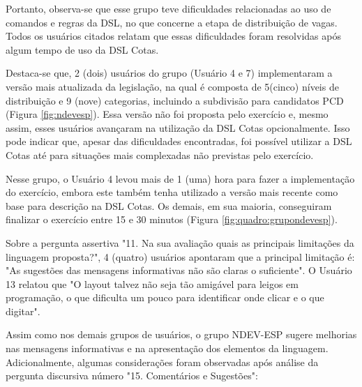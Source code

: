 Portanto, observa-se que esse grupo teve dificuldades relacionadas ao uso de comandos e regras da DSL, no que concerne a etapa de distribuição de vagas. Todos os usuários citados relatam que essas dificuldades foram resolvidas após algum tempo de uso da DSL Cotas.

Destaca-se que, 2 (dois) usuários do grupo (Usuário 4 e 7) implementaram a versão mais atualizada da legislação, na qual é composta de 5(cinco) níveis de distribuição e 9 (nove) categorias, incluindo a subdivisão para candidatos PCD (Figura \ref{fig:ndevesp}). Essa versão não foi proposta pelo exercício e, mesmo assim, esses usuários avançaram na utilização da DSL Cotas opcionalmente. Isso pode indicar que, apesar das dificuldades encontradas, foi possível utilizar a DSL Cotas até para situações mais complexadas não previstas pelo exercício.




Nesse grupo, o Usuário 4 levou mais de 1 (uma) hora para fazer a implementação do exercício, embora este também tenha utilizado a versão mais recente como base para descrição na DSL Cotas. Os demais, em sua maioria, conseguiram finalizar o exercício entre 15 e 30 minutos (Figura \ref{fig:quadro:grupondevesp}).



Sobre a pergunta assertiva "11. Na sua avaliação quais as principais limitações da linguagem proposta?", 4 (quatro) usuários apontaram que a principal limitação é: "As sugestões das mensagens informativas não são claras o suficiente". O Usuário 13 relatou que "O layout talvez não seja tão amigável para leigos em programação, o que dificulta um pouco para identificar onde clicar e o que digitar".

Assim como nos demais grupos de usuários, o grupo NDEV-ESP sugere melhorias nas mensagens informativas e na apresentação dos elementos da linguagem. Adicionalmente, algumas considerações foram observadas após análise da pergunta discursiva número "15. Comentários e Sugestões":

